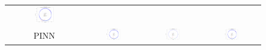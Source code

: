 \documentclass[11pt,a4paper, twocolumn]{article}
\begin{document}
\begin{figure}[H]
\begin{tabular}{cccc}
      \includegraphics[width=0.27\textwidth]{../inference_results/test/LSTM/two_body/500/full_trajectory_spaceship_0.png} \\
      PINN &
      \includegraphics[width=0.27\textwidth]{../inference_results/train/PINN/two_body/500/full_trajectory_spaceship_0.png} &
      \includegraphics[width=0.27\textwidth]{../inference_results/val/PINN/two_body/500/full_trajectory_spaceship_0.png} &
      \includegraphics[width=0.27\textwidth]{../inference_results/test/PINN/two_body/500/full_trajectory_spaceship_0.png}
  \end{tabular}
\end{figure}
\end{document}
